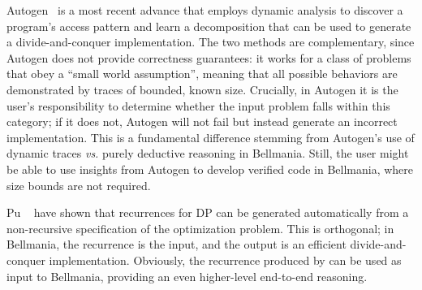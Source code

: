Autogen~\cite{PPoPP16/Chowdhury} is a most recent advance that employs dynamic analysis to discover
a program's access pattern and learn a decomposition that can be used to generate a divide-and-conquer
implementation. The two methods are complementary,
\cbstart{}
since Autogen does not provide correctness guarantees:
it works for a class of problems that obey a ``small world assumption'', meaning that all possible behaviors are demonstrated by traces of bounded, known size.
Crucially, in Autogen it is the user's responsibility to determine whether the input problem falls within this category;
if it does not, Autogen will not fail but instead generate an incorrect implementation.
This is a fundamental difference stemming from Autogen's use of dynamic traces \textit{vs.} purely deductive reasoning in Bellmania.
Still, the user might be able to use insights from Autogen to develop verified code in Bellmania,
where size bounds are not required.
\cbend

Pu \etal{}~\cite{OOPSLA11/Pu} have shown that recurrences for DP can be generated automatically from a non-recursive specification of the optimization problem.
This is orthogonal; in Bellmania, the recurrence is the input, and the output is an efficient divide-and-conquer implementation.
\cbstart
Obviously, the recurrence produced by \cite{OOPSLA11/Pu} can be used as input to Bellmania,
providing an even higher-level end-to-end reasoning.
\cbend

\begin{comment}
Our ``$\big/$'' operator can be compared to the separating disjunction ``$\ast$'' of Separation Logic~\cite{LICS02/Reynolds},
used to frame parts of the dynamic heap (which can be thought of as one large array),
in particular while checking that a program only accesses the parts allocated to it in its precondition.
While $\ast$ has the semantics of an existentially quantified predicate, Bellmania uses type qualifiers
to explicitly specify a formula defining each part. In this sense, it is more closely related to
Region Logic~\cite{ECOOP08/Banerjee}. These formulas make encoding in first-order logic straightforward,
and the use of Liquid Types allows for any number of dimensions and for decidable checking of domain inclusion
and disjointness.
\end{comment}